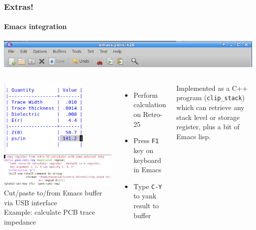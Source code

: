 \documentclass{beamer}
\newcommand{\tgreen}[1]{\textcolor{my-green}{#1}}
\newcommand{\tblue}[1]{\textcolor{my-blue}{#1}}
\begin{document}
\begin{frame}[fragile]
  \frametitle{Extras!}
  \framesubtitle{Emacs integration}

  \vskip -0.3in
  \includegraphics[width=\textwidth]{figs/emacs-toolbar.png}
  \vskip 0.2in

  \begin{columns}
    \includegraphics[width=0.75\textwidth]{figs/emacs-table.png}
    \vskip 0.2in
    \includegraphics[width=\textwidth]{figs/retro-25.el.png}
    \scriptsize
    \tblue{Cut/paste to/from Emacs buffer via USB interface} \\
    \tgreen{Example:  calculate PCB trace impedance}
      \begin{itemize}
      \scriptsize
      \item Perform calculation on Retro-25
      \item Press {\tt F1} key on keyboard in Emacs
      \item Type {\tt C-Y} to yank result to buffer
      \end{itemize}
    \vskip 0.3in
    Implemented as a C++ program ({\tt clip\_stack}) which can retrieve
    any stack level or storage register, plus a bit of Emacs lisp.
  \end{columns}
\end{frame}
\end{document}
